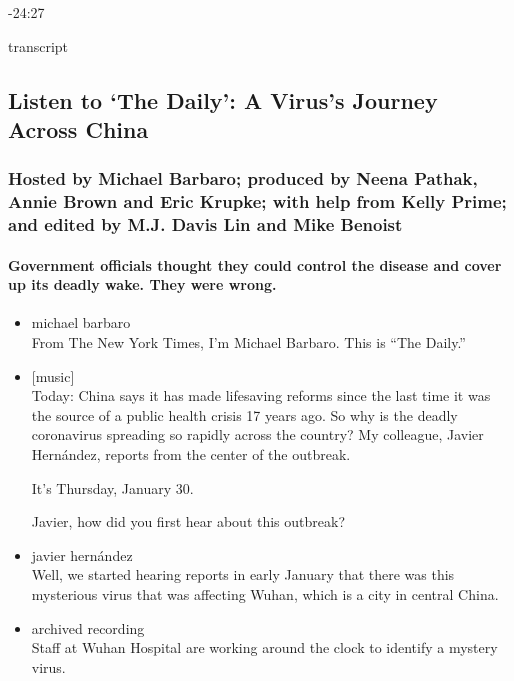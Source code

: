 -24:27

transcript

\hypertarget{listen-to-the-daily-a-viruss-journey-across-china-1}{%
\subsection{Listen to `The Daily': A Virus's Journey Across
China}\label{listen-to-the-daily-a-viruss-journey-across-china-1}}

\hypertarget{hosted-by-michael-barbaro-produced-by-neena-pathak-annie-brown-and-eric-krupke-with-help-from-kelly-prime-and-edited-by-mj-davis-lin-and-mike-benoist}{%
\subsubsection{Hosted by Michael Barbaro; produced by Neena Pathak,
Annie Brown and Eric Krupke; with help from Kelly Prime; and edited by
M.J. Davis Lin and Mike
Benoist}\label{hosted-by-michael-barbaro-produced-by-neena-pathak-annie-brown-and-eric-krupke-with-help-from-kelly-prime-and-edited-by-mj-davis-lin-and-mike-benoist}}

\hypertarget{government-officials-thought-they-could-control-the-disease-and-cover-up-its-deadly-wake-they-were-wrong}{%
\paragraph{Government officials thought they could control the disease
and cover up its deadly wake. They were
wrong.}\label{government-officials-thought-they-could-control-the-disease-and-cover-up-its-deadly-wake-they-were-wrong}}

\begin{itemize}
\item
  michael barbaro\\
  From The New York Times, I'm Michael Barbaro. This is ``The Daily.''
\item
  {[}music{]}\\
  Today: China says it has made lifesaving reforms since the last time
  it was the source of a public health crisis 17 years ago. So why is
  the deadly coronavirus spreading so rapidly across the country? My
  colleague, Javier Hernández, reports from the center of the outbreak.

  It's Thursday, January 30.

  Javier, how did you first hear about this outbreak?
\item
  javier hernández\\
  Well, we started hearing reports in early January that there was this
  mysterious virus that was affecting Wuhan, which is a city in central
  China.
\item
  archived recording\\
  Staff at Wuhan Hospital are working around the clock to identify a
  mystery virus.
\end{itemize}

